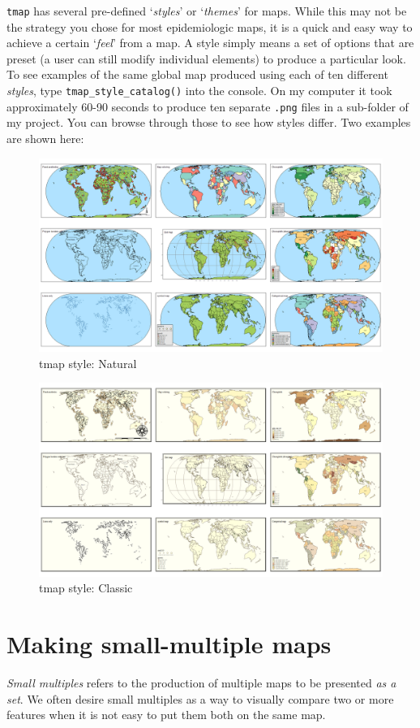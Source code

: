 \documentclass[
]{book}
\begin{document}
\texttt{tmap} has several pre-defined `\emph{styles}' or `\emph{themes}' for maps. While this may not be the strategy you chose for most epidemiologic maps, it is a quick and easy way to achieve a certain `\emph{feel}' from a map. A style simply means a set of options that are preset (a user can still modify individual elements) to produce a particular look. To see examples of the same global map produced using each of ten different \emph{styles}, type \texttt{tmap\_style\_catalog()} into the console. On my computer it took approximately 60-90 seconds to produce ten separate \texttt{.png} files in a sub-folder of my project. You can browse through those to see how styles differ. Two examples are shown here:

\begin{figure}
\includegraphics[width=0.5\linewidth]{images/natural} \caption{tmap style: Natural}\label{fig:unnamed-chunk-19}
\end{figure}

\begin{figure}
\includegraphics[width=0.5\linewidth]{images/classic} \caption{tmap style: Classic}\label{fig:unnamed-chunk-20}
\end{figure}

\hypertarget{making-small-multiple-maps}{%
\section{Making small-multiple maps}\label{making-small-multiple-maps}}

\emph{Small multiples} refers to the production of multiple maps to be presented \emph{as a set}. We often desire small multiples as a way to visually compare two or more features when it is not easy to put them both on the same map.
\end{document}
